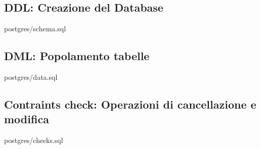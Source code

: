 \documentclass[a4paper]{article}
\begin{document}
\subsection{DDL: Creazione del Database}


{postgres/schema.sql}

\subsection{DML: Popolamento tabelle}

{postgres/data.sql}

\subsection{Contraints check: Operazioni di cancellazione e modifica}

{postgres/checks.sql}
\end{document}
